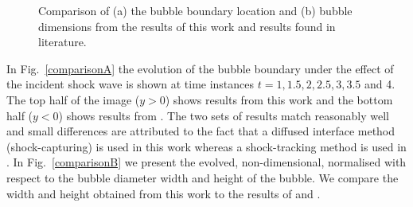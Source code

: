 \documentclass[3p,times,twocolumn]{elsarticle}
\begin{document}
\begin{figure}
\centering
\begin{subfigure}[b]{0.4\textwidth}
\end{subfigure}
\qquad
\begin{subfigure}[b]{0.47\textwidth}
\end{subfigure}
\caption{Comparison of (a) the bubble boundary location and (b)  bubble dimensions from the results of this work and results found in literature.}
\label{comparison}
 \end{figure}


In Fig.\ \ref{comparisonA} the evolution of the bubble boundary under the effect of the incident shock wave is shown at time instances $t=1,1.5,2,2.5,3,3.5$ and 4. The top half of the image ($y>0$) shows results from this work and the bottom half ($y<0$) shows results from \cite{xu2017explicit}. The two sets of results match reasonably well and small differences are attributed to the fact that a diffused interface method (shock-capturing) is used in this work whereas a shock-tracking method is used in \cite{xu2017explicit}. In Fig.\  \ref{comparisonB} we present the evolved, non-dimensional, normalised with respect to the bubble diameter width and height of the bubble. We compare the width and height obtained from this work to the results of \cite{terashima2010front} and \cite{xu2017explicit}.
\end{document}
